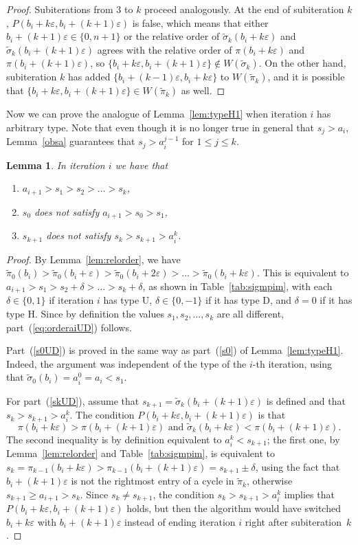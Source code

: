 \documentclass[11pt]{amsart}
\newtheorem{lemma}[theorem]{Lemma}
\newcommand\ben{\begin{enumerate}}
\newcommand\een{\end{enumerate}}
\newcommand\wt{\widetilde}
\newcommand\eps{\varepsilon}
\newcommand\sigm{\wt\sigma}
\newcommand\pim{\wt\pi}
\begin{document}
\begin{proof}
Subiterations from $3$ to $k$ proceed analogously. At the end of subiteration $k$, $P(b_i+k\eps,b_i+(k{+}1)\eps)$ is false, which means that either $b_i+(k{+}1)\eps\in\{0,n+1\}$
or the relative order of $\sigm_k(b_i+k\eps)$ and $\sigm_k(b_i+(k{+}1)\eps)$ agrees with the relative order of $\pi(b_i+k\eps)$ and $\pi(b_i+(k{+}1)\eps)$, so $\{b_i+k\eps,b_i+(k{+}1)\eps\}\notin W(\sigm_k)$.
On the other hand, subiteration $k$ has added $\{b_i+(k{-}1)\eps,b_i+k\eps\}$ to $W(\pim_k)$, and it is possible that $\{b_i+k\eps,b_i+(k{+}1)\eps\}\in W(\pim_k)$ as well.
\end{proof}

Now we can prove the analogue of Lemma~\ref{lem:typeH1} when iteration $i$ has arbitrary type. Note that even though it is no longer true in general that $s_j>a_i$, Lemma~\ref{obsa} guarantees that $s_j>a_i^{j-1}$
for $1\le j\le k$.

\begin{lemma}\label{lem:typeUD}
In iteration $i$ we have that
\ben \item \label{eq:orderaiUD}
$a_{i+1}>s_1>s_2>\dots>s_k$,
\item\label{s0UD} $s_0$ does not satisfy $a_{i+1}>s_0>s_1$,
\item\label{skUD} $s_{k+1}$ does not satisfy $s_k>s_{k+1}>a_i^k$.
\een
\end{lemma}

\begin{proof}
By Lemma~\ref{lem:relorder}, we have $\pim_0(b_i)>\pim_0(b_i+\eps)>\pim_0(b_i+2\eps)>\dots>\pim_0(b_i+k\eps)$. This is equivalent to $a_{i+1}>s_1>s_2+\delta>\dots>s_k+\delta$, as shown in Table~\ref{tab:sigmpim},
with each $\delta\in\{0,1\}$ if iteration $i$ has type U, $\delta\in\{0,-1\}$ if it has type D, and $\delta=0$ if it has type H. Since by definition the values $s_1,s_2,\dots,s_k$ are all different, part~(\ref{eq:orderaiUD}) follows.

Part~(\ref{s0UD}) is proved in the same way as part~(\ref{s0}) of Lemma~\ref{lem:typeH1}. Indeed, the argument was independent of the type of the $i$-th iteration, using that $\sigm_0(b_i)=a_i^0=a_i<s_1$.

For part~(\ref{skUD}), assume that $s_{k+1}=\sigm_k(b_i+(k{+}1)\eps)$ is defined and that $s_k>s_{k+1}>a_i^k$.
The condition $P(b_i+k\eps,b_i+(k{+}1)\eps)$ is that $$\pi(b_i+k\eps)>\pi(b_i+(k{+}1)\eps) \mbox{ and } \sigm_k(b_i+k\eps)<\pi(b_i+(k{+}1)\eps).$$
The second inequality is by definition equivalent to $a_i^k<s_{k+1}$; the first one, by Lemma~\ref{lem:relorder} and Table~\ref{tab:sigmpim}, is equivalent to $s_k=\pi_{k-1}(b_i+k\eps)>\pi_{k-1}(b_i+(k{+}1)\eps)=s_{k+1}\pm\delta$,
using the fact that $b_i+(k{+}1)\eps$ is not the rightmost entry of a cycle in $\pim_{k}$, otherwise $s_{k+1}\ge a_{i+1}>s_k$.
Since $s_k\neq s_{k+1}$, the condition $s_k>s_{k+1}>a_i^k$ implies that $P(b_i+k\eps,b_i+(k{+}1)\eps)$ holds, but then the algorithm would have switched $b_i+k\eps$ with $b_i+(k{+}1)\eps$
instead of ending iteration $i$ right after subiteration~$k$.
\end{proof}
\end{document}
